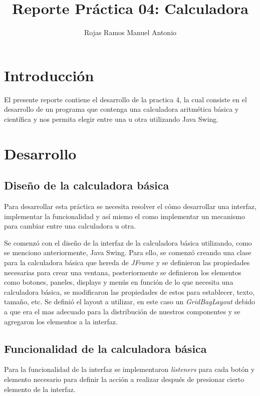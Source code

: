 \documentclass[]{article}
\title{Reporte Práctica 04: Calculadora}
\author{Rojas Ramos Manuel Antonio}
\begin{document}
\maketitle

\section{Introducción}

El presente reporte contiene el desarrollo de la practica 4, la cual consiste en el desarrollo de un programa que contenga una calculadora aritmética básica y científica y nos permita elegir entre una u otra utilizando Java Swing.

\section{Desarrollo}

\subsection{Diseño de la calculadora básica}

Para desarrollar esta práctica se necesita resolver el cómo desarrollar una interfaz, implementar la funcionalidad y así mismo el como implementar un mecanismo para cambiar entre una calculadora u otra.

Se comenzó con el diseño de la interfaz de la calculadora básica utilizando, como se menciono anteriormente, Java Swing. Para ello,  se comenzó creando una clase para la calculadora básica que hereda de \textit{JFrame} y se definieron las propiedades necesarias para crear una ventana, posteriormente se definieron los elementos como botones, paneles, displays y menús en función de lo que necesita una calculadora básica, se modificaron las propiedades de estos para establecer, texto, tamaño, etc. Se definió el layout a utilizar, en este caso un \textit{GridBagLayout} debido a que era el mas adecuado para la distribución de nuestros componentes y se agregaron los elementos a la interfaz.

\subsection{Funcionalidad de la calculadora básica}

Para la funcionalidad de la interfaz se implementaron \textit{listeners} para cada botón y elemento necesario para definir la acción a realizar después de presionar cierto elemento de la interfaz.
\end{document}
